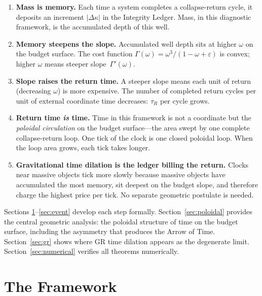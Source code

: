 \documentclass[
  aps,
  prd,
  twocolumn,
  superscriptaddress,
  nofootinbib,
  floatfix
]{revtex4-2}
\newcommand{\tR}{\tau_{\!R}}
\newcommand{\Gam}{\Gamma}
\newcommand{\eps}{\varepsilon}
\begin{document}
\begin{enumerate}[label=\textbf{(\Roman*)}]
  \item \textbf{Mass is memory.}
    Each time a system completes a collapse-return cycle, it
    deposits an increment $|\Delta\kappa|$ in the Integrity
    Ledger.  Mass, in this diagnostic framework, is the
    accumulated depth of this well.
  \item \textbf{Memory steepens the slope.}
    Accumulated well depth sits at higher $\omega$ on the
    budget surface.  The cost function $\Gam(\omega) =
    \omega^3/(1-\omega+\eps)$ is convex; higher $\omega$
    means steeper slope~$\Gam'(\omega)$.
  \item \textbf{Slope raises the return time.}
    A steeper slope means each unit of return (decreasing
    $\omega$) is more expensive.  The number of completed
    return cycles per unit of external coordinate time
    decreases: $\tR$ per cycle grows.
  \item \textbf{Return time \emph{is} time.}
    Time in this framework is not a coordinate but the
    \emph{poloidal circulation} on the budget surface---the
    area swept by one complete collapse-return loop.  One tick
    of the clock is one closed poloidal loop.  When the loop
    area grows, each tick takes longer.
  \item \textbf{Gravitational time dilation is the ledger
    billing the return.}
    Clocks near massive objects tick more slowly because
    massive objects have accumulated the most memory, sit
    deepest on the budget slope, and therefore charge the
    highest price per tick.  No separate geometric postulate
    is needed.
\end{enumerate}

Sections \ref{sec:kernel}--\ref{sec:event} develop each step
formally.  Section~\ref{sec:poloidal} provides the central
geometric analysis: the poloidal structure of time on the
budget surface, including the asymmetry that produces the
Arrow of Time.  Section~\ref{sec:gr} shows where GR time
dilation appears as the degenerate limit.
Section~\ref{sec:numerical} verifies all theorems
numerically.

\section{The Framework}\label{sec:kernel}
\end{document}

